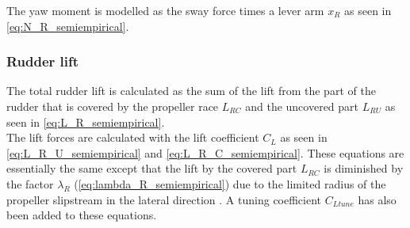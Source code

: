 The yaw moment is modelled as the sway force times a lever arm $x_R$ as seen in \autoref{eq:N_R_semiempirical}.
\begin{equation}
    \label{eq:N_R_semiempirical}
    
\end{equation}
%
%
\subsubsection{Rudder lift}
\label{sec:rudder lift}
The total rudder lift is calculated as the sum of the lift from the part of the rudder that is covered by the propeller race $L_{RC}$ and the uncovered part $L_{RU}$ as seen in \autoref{eq:L_R_semiempirical}.
\begin{equation}
    \label{eq:L_R_semiempirical}
    
\end{equation}
The lift forces are calculated with the lift coefficient $C_L$ as seen in \autoref{eq:L_R_U_semiempirical} and \autoref{eq:L_R_C_semiempirical}. These equations are essentially the same except that the lift by the covered part $L_{RC}$ is diminished by the factor $\lambda_R$ (\autoref{eq:lambda_R_semiempirical}) due to the limited radius of the propeller slipstream in the lateral direction \citep{brix_manoeuvring_1993}. A tuning coefficient $C_{Ltune}$ has also been added to these equations.
\begin{equation}
    \label{eq:L_R_U_semiempirical}
    
\end{equation}
%
\begin{equation}
    \label{eq:L_R_C_semiempirical}
    
\end{equation}

